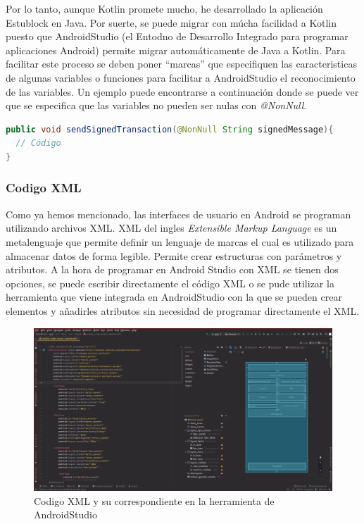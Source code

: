 Por lo tanto, aunque Kotlin promete mucho, he desarrollado la aplicación Estublock en Java. Por suerte, se puede migrar con múcha facilidad a Kotlin puesto que AndroidStudio (el Entodno de Desarrollo Integrado para programar aplicaciones Android) permite migrar automáticamente de Java a Kotlin. Para facilitar este proceso se deben poner ``marcas'' que especifiquen las caracteristicas de algunas variables o funciones para facilitar a AndroidStudio el reconocimiento de las variables. Un ejemplo puede encontrarse a continuación donde se puede ver que se especifica que las variables no pueden ser nulas con \emph{@NonNull}.

\begin{lstlisting}[language=Java,float=ht,caption={[Java] Ejemplo de ``etiquetado'' de variables para facilitar el salto a Kotlin},label=lst:java_etiquetas]
public void sendSignedTransaction(@NonNull String signedMessage){
  // Código
}
\end{lstlisting}

\subsubsection{Codigo XML}

Como ya hemos mencionado, las interfaces de usuario en Android se programan utilizando archivos XML. XML del ingles \emph{Extensible Markup Language} es un metalenguaje que permite definir un lenguaje de marcas el cual es utilizado para almacenar datos de forma legible. Permite crear estructuras con parámetros y atributos. A la hora de programar en Android Studio con XML se tienen dos opciones, se puede escribir directamente el código XML o se pude utilizar la herramienta que viene integrada en AndroidStudio con la que se pueden crear elementos y añadirles atributos sin necesidad de programar directamente el XML. 

\begin{figure}[h!]
  \centering
  \includegraphics[width=0.95\linewidth]{figs/Desarrollo/xml_vs_ezpz}
  \caption[XML]{Codigo XML y su correspondiente en la herramienta de AndroidStudio}
  \label{fig:xml_vs_ezpz}
\end{figure}

